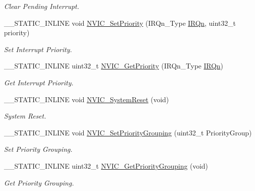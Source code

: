 \begin{DoxyCompactItemize}
\begin{DoxyCompactList}\small\item\em Clear Pending Interrupt. \end{DoxyCompactList}\item 
\+\_\+\+\_\+\+S\+T\+A\+T\+I\+C\+\_\+\+I\+N\+L\+I\+NE void \hyperlink{group__CMSIS__Core__NVICFunctions_ga2305cbd44aaad792e3a4e538bdaf14f9}{N\+V\+I\+C\+\_\+\+Set\+Priority} (I\+R\+Qn\+\_\+\+Type \hyperlink{group__Interrupt__vector__numbers_ga666eb0caeb12ec0e281415592ae89083}{I\+R\+Qn}, uint32\+\_\+t priority)
\begin{DoxyCompactList}\small\item\em Set Interrupt Priority. \end{DoxyCompactList}\item 
\+\_\+\+\_\+\+S\+T\+A\+T\+I\+C\+\_\+\+I\+N\+L\+I\+NE uint32\+\_\+t \hyperlink{group__CMSIS__Core__NVICFunctions_ga1cbaf8e6abd4aa4885828e7f24fcfeb4}{N\+V\+I\+C\+\_\+\+Get\+Priority} (I\+R\+Qn\+\_\+\+Type \hyperlink{group__Interrupt__vector__numbers_ga666eb0caeb12ec0e281415592ae89083}{I\+R\+Qn})
\begin{DoxyCompactList}\small\item\em Get Interrupt Priority. \end{DoxyCompactList}\item 
\+\_\+\+\_\+\+S\+T\+A\+T\+I\+C\+\_\+\+I\+N\+L\+I\+NE void \hyperlink{group__CMSIS__Core__NVICFunctions_ga1143dec48d60a3d6f238c4798a87759c}{N\+V\+I\+C\+\_\+\+System\+Reset} (void)
\begin{DoxyCompactList}\small\item\em System Reset. \end{DoxyCompactList}\item 
\+\_\+\+\_\+\+S\+T\+A\+T\+I\+C\+\_\+\+I\+N\+L\+I\+NE void \hyperlink{group__CMSIS__Core__NVICFunctions_ga77cfbb35a9d8027e392034321bed6904}{N\+V\+I\+C\+\_\+\+Set\+Priority\+Grouping} (uint32\+\_\+t Priority\+Group)
\begin{DoxyCompactList}\small\item\em Set Priority Grouping. \end{DoxyCompactList}\item 
\+\_\+\+\_\+\+S\+T\+A\+T\+I\+C\+\_\+\+I\+N\+L\+I\+NE uint32\+\_\+t \hyperlink{group__CMSIS__Core__NVICFunctions_ga394f7ce2ca826c0da26284d17ac6524d}{N\+V\+I\+C\+\_\+\+Get\+Priority\+Grouping} (void)
\begin{DoxyCompactList}\small\item\em Get Priority Grouping. \end{DoxyCompactList}\item 

\end{DoxyCompactItemize}
